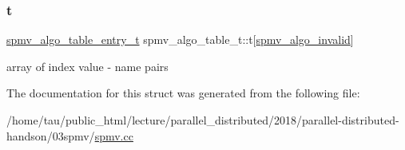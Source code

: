 \subsubsection{\texorpdfstring{t}{t}}
{\footnotesize\ttfamily \hyperlink{structspmv__algo__table__entry__t}{spmv\+\_\+algo\+\_\+table\+\_\+entry\+\_\+t} spmv\+\_\+algo\+\_\+table\+\_\+t\+::t\mbox{[}\hyperlink{spmv_8cc_ad2cf0493af54bf76c5be68b4634fcab7add2a1e0329d677ee5f5fcc7ee8077dd0}{spmv\+\_\+algo\+\_\+invalid}\mbox{]}}

array of index value -\/ name pairs 

The documentation for this struct was generated from the following file\+:\begin{DoxyCompactItemize}
\item 
/home/tau/public\+\_\+html/lecture/parallel\+\_\+distributed/2018/parallel-\/distributed-\/handson/03spmv/\hyperlink{spmv_8cc}{spmv.\+cc}\end{DoxyCompactItemize}
